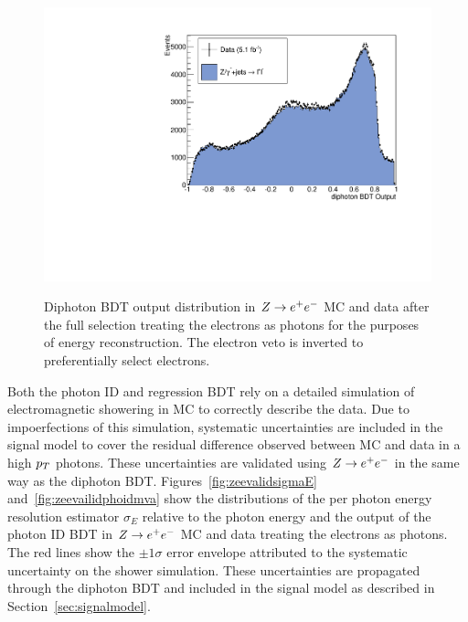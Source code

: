 \begin{figure}
\begin{center}
  \includegraphics[width=.6\textwidth]{hgg7TeV/zeeValidation/zeevalidationdipho.pdf}
\label{fig:zeevaliddiphomva}
\caption{Diphoton BDT output distribution in $Z\rightarrow e^{+}e^{-}$ MC and data after the full selection 
treating the electrons as photons for the purposes of energy reconstruction. The electron 
veto is inverted to preferentially select electrons.}
\end{center}
\end{figure}

Both the photon ID and regression BDT rely on a detailed simulation of electromagnetic showering  
in MC to correctly describe the data. Due to impoerfections of this simulation, systematic
uncertainties are included in the signal model to cover the residual difference observed between MC and data
in a high $p_{T}$ photons. 
These uncertainties are validated using $Z\rightarrow e^{+}e^{-}$ in the same way as the diphoton BDT. 
Figures~\ref{fig:zeevalidsigmaE} and~\ref{fig:zeevailidphoidmva} show the distributions of the 
per photon energy resolution estimator $\sigma_{E}$ relative to the photon energy and the output of the 
photon ID BDT in $Z\rightarrow e^{+}e^{-}$ MC and data treating the electrons as photons. The red lines
show the $\pm 1\sigma$ error envelope attributed to the systematic uncertainty on the shower simulation.
These uncertainties are propagated through the diphoton BDT and included in the signal model as described in 
Section~\ref{sec:signalmodel}.

